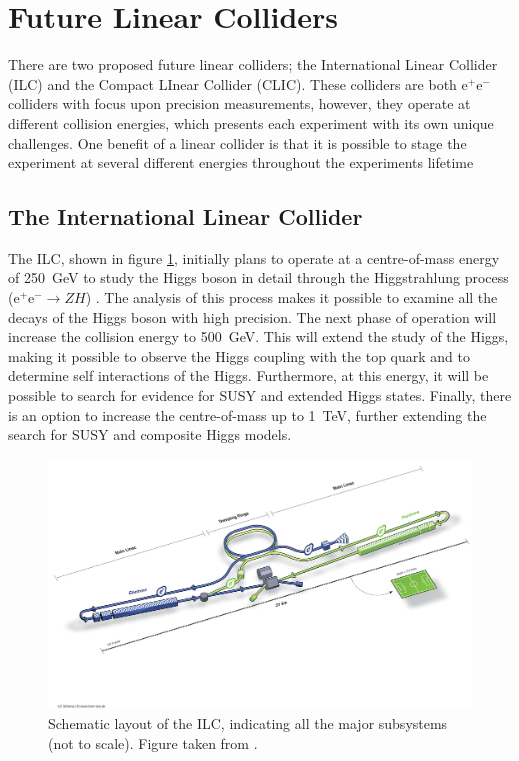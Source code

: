 
\section{Future Linear Colliders}
There are two proposed future linear colliders; the International Linear Collider (ILC) and the Compact LInear Collider (CLIC).  These colliders are both $\text{e}^{+}\text{e}^{-}$ colliders with focus upon precision measurements, however, they operate at different collision energies, which presents each experiment with its own unique challenges.  One benefit of a linear collider is that it is possible to stage the experiment at several different energies throughout the experiments lifetime


\subsection{The International Linear Collider}
The ILC, shown in figure \ref{fig:ilc}, initially plans to operate at a centre-of-mass energy of 250~GeV to study the Higgs boson in detail through the Higgstrahlung process ($\text{e}^{+}\text{e}^{-} \rightarrow ZH$) \cite{Behnke:2013xla}.  The analysis of this process makes it possible to examine all the decays of the Higgs boson with high precision.  The next phase of operation will increase the collision energy to 500~GeV.  This will extend the study of the Higgs, making it possible to observe the Higgs coupling with the top quark and to determine self interactions of the Higgs.  Furthermore, at this energy, it will be possible to search for evidence for SUSY and extended Higgs states.  Finally, there is an option to increase the centre-of-mass up to 1~TeV, further extending the search for SUSY and composite Higgs models.

\begin{figure}[h!]
\includegraphics[width=1.0\textwidth]{Introduction/Plots/ILC.jpg}
\caption[Schematic layout of the ILC, indicating all the major subsystems (not to scale).  Figure taken from \cite{Behnke:2013xla}.]{Schematic layout of the ILC, indicating all the major subsystems (not to scale).  Figure taken from \cite{Behnke:2013xla}.}
\label{fig:ilc}
\end{figure}

